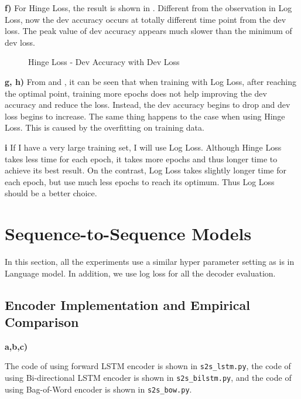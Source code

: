 \documentclass{article}
\begin{document}
\textbf{f)}
For Hinge Loss, the result is shown in . Different from the observation in Log Loss, now the dev accuracy occurs at totally different time point from the dev loss. The peak value of dev accuracy appears much slower than the minimum of dev loss.
\begin{figure}
\centering
{}
\caption{Hinge Loss - Dev Accuracy with Dev Loss}
\label{fig:hingeloss_acc_loss}
\end{figure}

\textbf{g, h)}
From  and , it can be seen that when training with Log Loss, after reaching the optimal point, training more epochs does not help improving the dev accuracy and reduce the loss. Instead, the dev accuracy begins to drop and dev loss begins to increase. The same thing happens to the case when using Hinge Loss. This is caused by the overfitting on training data.

\textbf{i}
If I have a very large training set, I will use Log Loss. Although Hinge Loss takes less time for each epoch, it takes more epochs and thus longer time to achieve its best result. On the contrast, Log Loss takes slightly longer time for each epoch, but use much less epochs to reach its optimum. Thus Log Loss should be a better choice.

\section{Sequence-to-Sequence Models}
In this section, all the experiments use a similar hyper parameter setting as is in Language model. In addition, we use log loss for all the decoder evaluation.
\subsection{Encoder Implementation and Empirical Comparison}
\textbf{a,b,c)} 

The code of using forward LSTM encoder is shown in \texttt{s2s\_lstm.py}, 
the code of using Bi-directional LSTM encoder is shown in \texttt{s2s\_bilstm.py}, and 
the code of using Bag-of-Word encoder is shown in \texttt{s2s\_bow.py}. 
\end{document}
